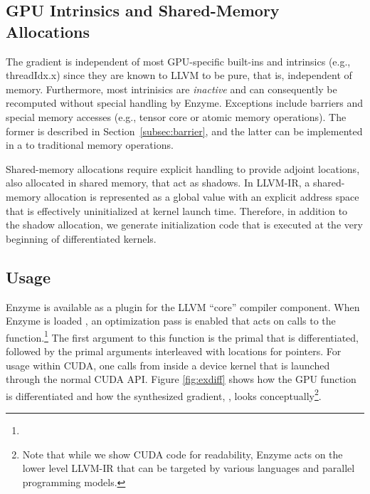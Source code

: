 \subsection{GPU Intrinsics and Shared-Memory Allocations}

The gradient is independent of most GPU-specific built-ins and intrinsics (e.g., threadIdx.x) since they are known to LLVM to be pure, that is, independent of memory.
Furthermore, most intrinisics are {\it inactive} and can consequently be recomputed without special handling by Enzyme.
Exceptions include barriers and special memory accesses (e.g., tensor core or atomic memory operations).
The former is described in Section~\ref{subsec:barrier}, and the latter can be implemented in a  to traditional memory operations.

 Shared-memory allocations require explicit handling to provide adjoint locations, also allocated in shared memory, that act as shadows.
In LLVM-IR, a shared-memory allocation is represented as a global value with an explicit address space that is effectively uninitialized at kernel launch time.
Therefore, in addition to the shadow allocation, we generate initialization code that is executed at the very beginning of differentiated kernels.


\subsection{Usage}
\label{subsec:usage}
Enzyme is available as a plugin for the LLVM ``core'' compiler component.
When Enzyme is loaded , an optimization pass is enabled that acts on calls to the  function.\footnote{} 
The first argument to this function is the primal that is differentiated, followed by the primal arguments interleaved with  locations for pointers.
For usage within CUDA, one calls  from inside a device kernel that is launched through the normal CUDA API. 
Figure \ref{fig:exdiff} shows how the GPU function  is differentiated and how the synthesized gradient, , looks conceptually\footnote{Note that while we show CUDA code for readability, Enzyme acts on the lower level LLVM-IR that can be targeted by various languages and parallel programming models.}.


